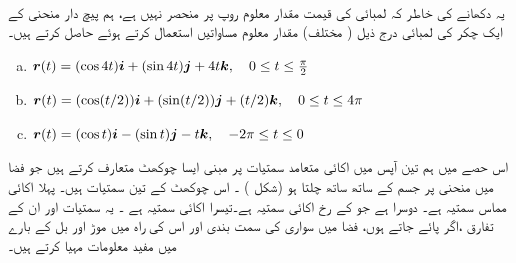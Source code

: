 \\
یہ دکھانے کی خاطر کہ لمبائی کی قیمت مقدار معلوم روپ پر منحصر نہیں ہے، ہم  پیچ دار منحنی کے ایک چکر کی لمبائی درج  ذیل ( مختلف) مقدار معلوم مساواتیں استعمال کرتے ہوئے حاصل کرتے ہیں۔
\begin{enumerate}[a.]
\item
${{\boldsymbol{r}}}(t)=(\cos 4t){\boldsymbol{i}}+(\sin 4t){\boldsymbol{j}}+4t{\boldsymbol{k}},\quad 0\le t\le \tfrac{\pi}{2}$
\item
${{\boldsymbol{r}}}(t)=(\cos (t/2)){\boldsymbol{i}}+(\sin (t/2)){\boldsymbol{j}}+(t/2){\boldsymbol{k}},\quad 0\le t\le 4\pi$
\item
${{\boldsymbol{r}}}(t)=(\cos t){\boldsymbol{i}}-(\sin t){\boldsymbol{j}}-t{\boldsymbol{k}},\quad -2\pi \le t\le 0$
\end{enumerate}



اس حصے میں ہم   تین آپس میں  اکائی  متعامد سمتیات پر مبنی ایسا چوکھٹ متعارف کرتے ہیں جو  فضا میں منحنی پر جسم کے ساتھ ساتھ چلتا ہو (شکل ) ۔ اس چوکھٹ کے تین سمتیات  ہیں۔ پہلا  اکائی مماس سمتیہ  ہے۔ دوسرا  ہے جو   کے رخ اکائی سمتیہ ہے۔تیسرا اکائی سمتیہ   ہے ۔ یہ سمتیات اور ان کے تفارق  ،اگر پائے جاتے ہوں، فضا  میں سواری  کی  سمت بندی اور اس کی راہ  میں موڑ  اور بل  کے بارے میں مفید معلومات   مہیا کرتے ہیں۔

